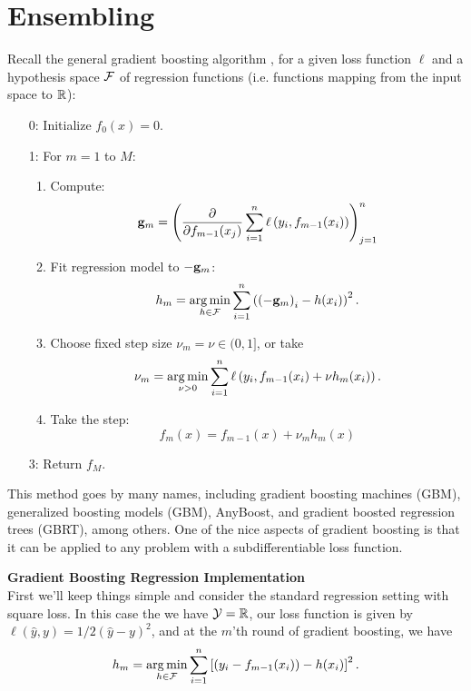 \documentclass{article}
\newcommand{\nyuparagraph}[1]{\vspace{0.3cm}\textcolor{nyupurple}{\bf \large #1}\\}
\theoremstyle{plain}
\theoremstyle{definition}
\begin{document}
\section{Ensembling}

Recall the general gradient boosting algorithm
, for a given loss function $\ell$ and a hypothesis space $\mathcal{F}$
of regression functions (i.e. functions mapping from the input space
to $\mathbb{R}$): 
\begin{enumerate}
\setcounter{enumi}{\value{saveenum}}
\item[0:] Initialize $f_{0}(x)=0$. 
\item[1:] For $m=1$ to $M$:

\begin{enumerate}
\item Compute: 
\[
{\bf g}_{m}=\left( \frac{\partial}{\partial f_{m-1}(x_{j})}\sum_{i=1}^{n}\ell\left(y_{i},f_{m-1}(x_{i})\right)\right)_{j=1}^{n}
\]
\item Fit regression model to $-{\bf g}_{m}$: 
\[
h_{m}=\argmin_{h\in\cf}\sum_{i=1}^{n}\left(\left(-{\bf g}_{m}\right)_{i}-h(x_{i})\right)^{2}.
\]
\item Choose fixed step size $\nu_{m}=\nu\in(0,1]$, or take 
\[
\nu_{m}=\argmin_{\nu>0}\sum_{i=1}^{n}\ell\left(y_{i},f_{m-1}(x_{i})+\nu h_{m}(x_{i})\right).
\]
\item Take the step: 
\[
f_{m}(x)=f_{m-1}(x)+\nu_{m}h_{m}(x)
\]
\end{enumerate}
\item[3:] Return $f_{M}$. 
\end{enumerate}


This method goes by many names, including gradient boosting machines
(GBM), generalized boosting models (GBM), AnyBoost, and gradient boosted
regression trees (GBRT), among others. One of the nice aspects
of gradient boosting is that it can be applied to any problem with
a subdifferentiable loss function.


\nyuparagraph{Gradient Boosting Regression Implementation}
First we'll keep things simple and consider the standard regression setting with square loss. In this case the we have $\mathcal{Y}=\mathbb{R}$, our
loss function is given by $
\ell(\hat{y},y)=1/2\left(\hat{y}-y\right)^{2}$,
and at the $m$'th round of gradient boosting, we
have
\[
h_{m}=\argmin_{h\in\cf}\sum_{i=1}^{n}\left[\left(y_{i}-f_{m-1}(x_{i})\right)-h(x_{i})\right]^{2}.
\]
\end{document}
